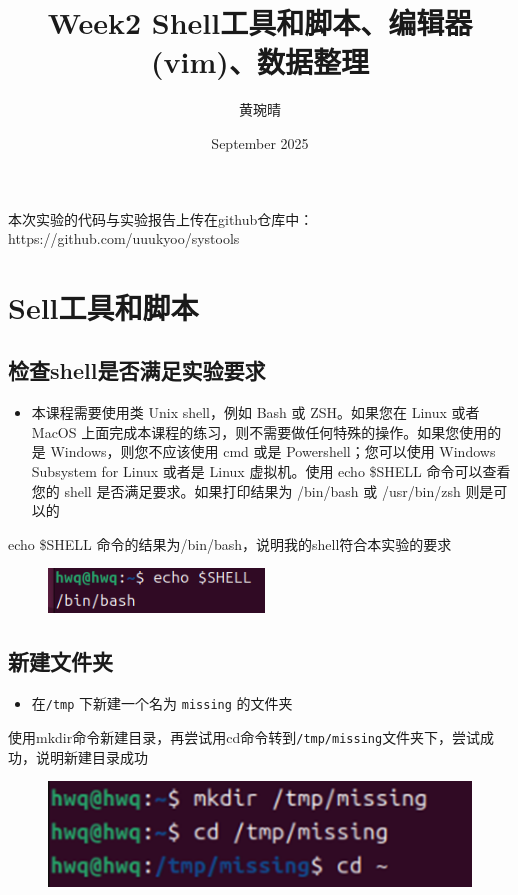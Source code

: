 \documentclass[a4paper, 12pt]{article}
\begin{document}
\title{Week2 Shell工具和脚本、编辑器(vim)、数据整理}
\author{黄琬晴}
\date{September 2025}
\maketitle
\begin{center}
    本次实验的代码与实验报告上传在github仓库中：\\
    https://github.com/uuukyoo/systools
\end{center}
\tableofcontents
\newpage
{}


\section{Sell工具和脚本}
\subsection{检查shell是否满足实验要求}
\begin{itemize}
    \item 本课程需要使用类 Unix shell，例如 Bash 或 ZSH。如果您在 Linux 或者 MacOS 上面完成本课程的练习，则不需要做任何特殊的操作。如果您使用的是 Windows，则您不应该使用 cmd 或是 Powershell；您可以使用 Windows Subsystem for Linux 或者是 Linux 虚拟机。使用 echo \$SHELL 命令可以查看您的 shell 是否满足要求。如果打印结果为 /bin/bash 或 /usr/bin/zsh 则是可以的
    
\end{itemize}
echo \$SHELL 命令的结果为/bin/bash，说明我的shell符合本实验的要求
\begin{figure}[H]
    \centering
    \includegraphics[width=1\linewidth]{shell22.png}
\end{figure}
\subsection{新建文件夹}
\begin{itemize}
    \item 在\verb|/tmp| 下新建一个名为 \verb|missing| 的文件夹

\end{itemize}
\par 使用mkdir命令新建目录，再尝试用cd命令转到\verb|/tmp/missing|文件夹下，尝试成功，说明新建目录成功
\begin{figure}[H]
    \centering
    \includegraphics[width=1\linewidth]{shell1.png}
\end{figure}
\end{document}
